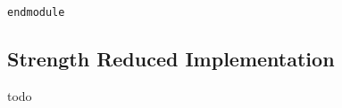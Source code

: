 \begin{verbatim}
endmodule

\end{verbatim}
\subsection{Strength Reduced Implementation}
\label{sec:source2}
todo

